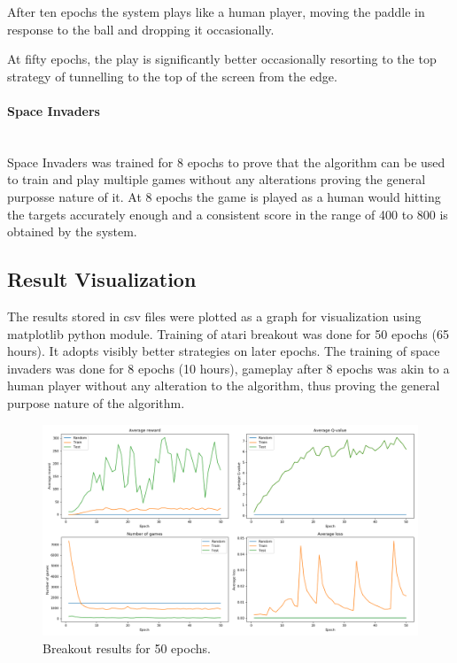 \documentclass[a4paper,11pt]{article}
\newcommand{\mparagraph}[1]{\paragraph{#1}\mbox{}\\}
\begin{document}
				After ten epochs the system plays like a human player, moving the paddle in response to the ball and dropping it occasionally.

				At fifty epochs, the play is significantly better occasionally resorting to the top strategy of tunnelling to the top of the screen from the edge.

			\mparagraph{Space Invaders}
				Space Invaders was trained for 8 epochs to prove that the algorithm can be used to train and play multiple games without any alterations proving the general purposse nature of it. At 8 epochs the game is played as a human would hitting the targets accurately enough and a consistent score in the range of 400 to 800 is obtained by the system.

		\subsection{Result Visualization}
			The results stored in csv files were plotted as a graph for visualization using matplotlib python module. Training of atari breakout was done for 50 epochs (65 hours). It  adopts visibly better strategies on later epochs. The training of space invaders was done for 8 epochs (10 hours), gameplay after 8 epochs was akin to a human player without any alteration to the algorithm, thus proving the general purpose nature of the algorithm.

			\begin{figure}[!h]
				\begin{centering}
					\includegraphics[width=15cm]{images/breakout.png}
					\caption{Breakout results for 50 epochs.}
				\end{centering}
			\end{figure}			
			
\end{document}
